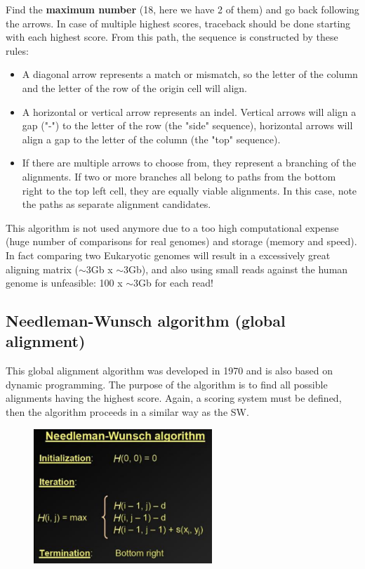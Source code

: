 Find the \textbf{maximum number} (18, here we have 2 of them) and go back following the arrows. In case of multiple highest scores, traceback should be done starting with each highest score.
From this path, the sequence is constructed by these rules:

\begin{itemize}
    \item A diagonal arrow represents a match or mismatch, so the letter of the column and the letter of the row of the origin cell will align.
    \item A horizontal or vertical arrow represents an indel. Vertical arrows will align a gap ("-") to the letter of the row (the "side" sequence), horizontal arrows will align a gap to the letter of the column (the "top" sequence).
    \item If there are multiple arrows to choose from, they represent a branching of the alignments. If two or more branches all belong to paths from the bottom right to the top left cell, they are equally viable alignments. In this case, note the paths as separate alignment candidates.
\end{itemize}

This algorithm is not used anymore due to a too high computational expense (huge number of comparisons for real genomes) and storage (memory and speed). In fact comparing two Eukaryotic genomes will result in a excessively great aligning matrix ($\sim$3Gb x $\sim$3Gb), and also using small reads against the human genome is unfeasible: 100 x $\sim$3Gb for each read!

\subsection{Needleman-Wunsch algorithm (global alignment)}

This global alignment algorithm was developed in 1970 and is also based on dynamic programming. The purpose of the algorithm is to find all possible alignments having the highest score. Again, a scoring system must be defined, then the algorithm proceeds in a similar way as the SW. 

\begin{figure}[h]
\centering
\includegraphics[width=0.6\textwidth]{Needleman.png}
\caption{}
\end{figure}

